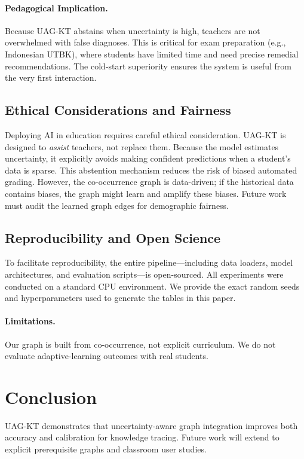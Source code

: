\documentclass[11pt]{article}
\begin{document}
\paragraph{Pedagogical Implication.} Because UAG-KT abstains when uncertainty is high, teachers are not overwhelmed with false diagnoses. This is critical for exam preparation (e.g., Indonesian UTBK), where students have limited time and need precise remedial recommendations. The cold-start superiority ensures the system is useful from the very first interaction.

\subsection{Ethical Considerations and Fairness}
Deploying AI in education requires careful ethical consideration. UAG-KT is designed to \textit{assist} teachers, not replace them. Because the model estimates uncertainty, it explicitly avoids making confident predictions when a student's data is sparse. This abstention mechanism reduces the risk of biased automated grading. However, the co-occurrence graph is data-driven; if the historical data contains biases, the graph might learn and amplify these biases. Future work must audit the learned graph edges for demographic fairness.

\subsection{Reproducibility and Open Science}
To facilitate reproducibility, the entire pipeline---including data loaders, model architectures, and evaluation scripts---is open-sourced. All experiments were conducted on a standard CPU environment. We provide the exact random seeds and hyperparameters used to generate the tables in this paper.

\paragraph{Limitations.} Our graph is built from co-occurrence, not explicit curriculum. We do not evaluate adaptive-learning outcomes with real students.

\section{Conclusion}
UAG-KT demonstrates that uncertainty-aware graph integration improves both accuracy and calibration for knowledge tracing. Future work will extend to explicit prerequisite graphs and classroom user studies.



\end{document}

